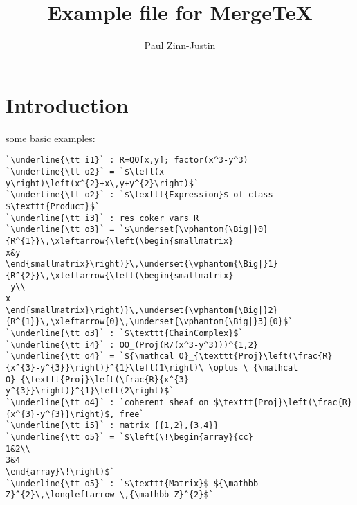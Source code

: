 \documentclass[12pt,a4paper]{amsart}
\title{Example file for MergeTeX}
\author{Paul Zinn-Justin}
\begin{document}
\maketitle

\section{Introduction}
some basic examples:
\begin{lstlisting}[language=Macaulay2output]
`\underline{\tt i1}` : R=QQ[x,y]; factor(x^3-y^3)
`\underline{\tt o2}` = `$\left(x-y\right)\left(x^{2}+x\,y+y^{2}\right)$`
`\underline{\tt o2}` : `$\texttt{Expression}$ of class $\texttt{Product}$`
`\underline{\tt i3}` : res coker vars R
`\underline{\tt o3}` = `$\underset{\vphantom{\Big|}0}{R^{1}}\,\xleftarrow{\left(\begin{smallmatrix}
x&y
\end{smallmatrix}\right)}\,\underset{\vphantom{\Big|}1}{R^{2}}\,\xleftarrow{\left(\begin{smallmatrix}
-y\\
x
\end{smallmatrix}\right)}\,\underset{\vphantom{\Big|}2}{R^{1}}\,\xleftarrow{0}\,\underset{\vphantom{\Big|}3}{0}$`
`\underline{\tt o3}` : `$\texttt{ChainComplex}$`
`\underline{\tt i4}` : OO_(Proj(R/(x^3-y^3)))^{1,2}
`\underline{\tt o4}` = `${\mathcal O}_{\texttt{Proj}\left(\frac{R}{x^{3}-y^{3}}\right)}^{1}\left(1\right)\ \oplus \ {\mathcal O}_{\texttt{Proj}\left(\frac{R}{x^{3}-y^{3}}\right)}^{1}\left(2\right)$`
`\underline{\tt o4}` : `coherent sheaf on $\texttt{Proj}\left(\frac{R}{x^{3}-y^{3}}\right)$, free`
`\underline{\tt i5}` : matrix {{1,2},{3,4}}
`\underline{\tt o5}` = `$\left(\!\begin{array}{cc}
1&2\\
3&4
\end{array}\!\right)$`
`\underline{\tt o5}` : `$\texttt{Matrix}$ ${\mathbb Z}^{2}\,\longleftarrow \,{\mathbb Z}^{2}$`
\end{lstlisting}
\end{document}

